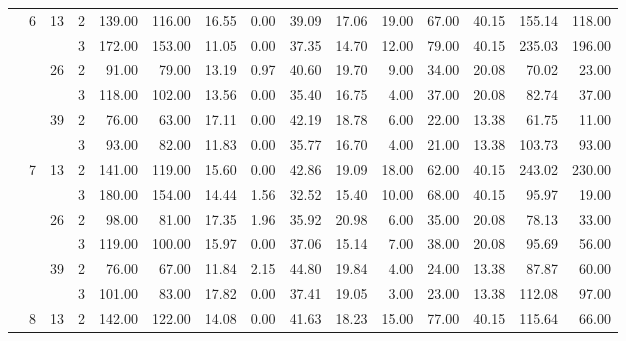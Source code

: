 \begin{tabular}{llllrrrrrrrrrrr}
\cline{2-15}
\cline{3-15}
               & \multirow{6}{*}{6} & \multirow{2}{*}{13} & 2 &   139.00 &    116.00 & 16.55 &    0.00 &   39.09 &   17.06 &   19.00 &   67.00 &   40.15 & 155.14 &   118.00 \\
               &   &    & 3 &   172.00 &    153.00 & 11.05 &    0.00 &   37.35 &   14.70 &   12.00 &   79.00 &   40.15 & 235.03 &   196.00 \\
\cline{3-15}
               &   & \multirow{2}{*}{26} & 2 &    91.00 &     79.00 & 13.19 &    0.97 &   40.60 &   19.70 &    9.00 &   34.00 &   20.08 &  70.02 &    23.00 \\
               &   &    & 3 &   118.00 &    102.00 & 13.56 &    0.00 &   35.40 &   16.75 &    4.00 &   37.00 &   20.08 &  82.74 &    37.00 \\
\cline{3-15}
               &   & \multirow{2}{*}{39} & 2 &    76.00 &     63.00 & 17.11 &    0.00 &   42.19 &   18.78 &    6.00 &   22.00 &   13.38 &  61.75 &    11.00 \\
               &   &    & 3 &    93.00 &     82.00 & 11.83 &    0.00 &   35.77 &   16.70 &    4.00 &   21.00 &   13.38 & 103.73 &    93.00 \\
\cline{2-15}
\cline{3-15}
               & \multirow{6}{*}{7} & \multirow{2}{*}{13} & 2 &   141.00 &    119.00 & 15.60 &    0.00 &   42.86 &   19.09 &   18.00 &   62.00 &   40.15 & 243.02 &   230.00 \\
               &   &    & 3 &   180.00 &    154.00 & 14.44 &    1.56 &   32.52 &   15.40 &   10.00 &   68.00 &   40.15 &  95.97 &    19.00 \\
\cline{3-15}
               &   & \multirow{2}{*}{26} & 2 &    98.00 &     81.00 & 17.35 &    1.96 &   35.92 &   20.98 &    6.00 &   35.00 &   20.08 &  78.13 &    33.00 \\
               &   &    & 3 &   119.00 &    100.00 & 15.97 &    0.00 &   37.06 &   15.14 &    7.00 &   38.00 &   20.08 &  95.69 &    56.00 \\
\cline{3-15}
               &   & \multirow{2}{*}{39} & 2 &    76.00 &     67.00 & 11.84 &    2.15 &   44.80 &   19.84 &    4.00 &   24.00 &   13.38 &  87.87 &    60.00 \\
               &   &    & 3 &   101.00 &     83.00 & 17.82 &    0.00 &   37.41 &   19.05 &    3.00 &   23.00 &   13.38 & 112.08 &    97.00 \\
\cline{2-15}
\cline{3-15}
               & \multirow{6}{*}{8} & \multirow{2}{*}{13} & 2 &   142.00 &    122.00 & 14.08 &    0.00 &   41.63 &   18.23 &   15.00 &   77.00 &   40.15 & 115.64 &    66.00 \\

\end{tabular}
